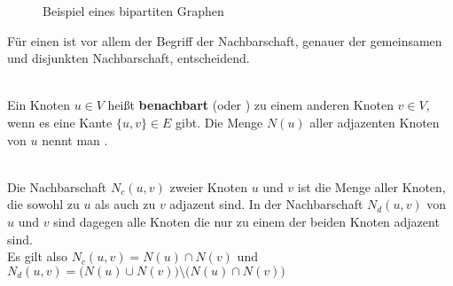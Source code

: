 \begin{figure}[h]
\centering
{}
\caption{Beispiel eines bipartiten Graphen}
\label{fig:beispiel_bipartit}
\end{figure}
Für einen \ct ist vor allem der Begriff der Nachbarschaft, genauer der gemeinsamen und disjunkten 
Nachbarschaft, entscheidend.
\begin{definition}[Nachbarschaft]~\\
Ein Knoten $u \in V$ heißt \textbf{benachbart} (oder ) zu einem 
anderen Knoten $v \in V$, wenn es eine Kante $\{u,v\} \in E $ gibt. Die Menge $N(u)$ aller adjazenten Knoten
von $u$ nennt man .
\end{definition}
\begin{definition}~\\
	Die  Nachbarschaft $N_{c}(u,v)$ zweier Knoten $u$ und $v$ ist die Menge aller Knoten, die sowohl
	zu $u$ als auch zu $v$ adjazent sind. In der  Nachbarschaft $N_{d}(u,v)$ von $u$ und $v$ sind dagegen 
	alle Knoten die nur zu einem der beiden Knoten adjazent sind. \\
	Es gilt also $N_{c}(u,v) = N(u) \cap N(v)$ und $N_{d}(u,v) = \big(N(u) \cup N(v)\big)\setminus \big(N(u) \cap N(v) \big)$
\end{definition}

